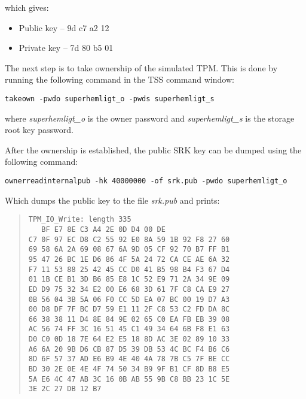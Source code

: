 \documentclass[10pt]{article}
\newcommand{\command}[1]{\texttt{#1}}
\begin{document}
      which gives:

      \begin{itemize}
        \item{Public key -- 9d c7 a2 12}
        \item{Private key -- 7d 80 b5 01}
      \end{itemize}

      The next step is to take ownership of the simulated TPM. This is done by
      running the following command in the TSS command window:

      \command{takeown -pwdo superhemligt\_o -pwds superhemligt\_s}

      where \textit{superhemligt\_o} is the owner password and
      \textit{superhemligt\_s} is the storage root key password.

      After the ownership is established, the public SRK key can be dumped using
      the following command:

      \command{ownerreadinternalpub -hk 40000000 -of srk.pub -pwdo
      superhemligt\_o}

      Which dumps the public key to the file \textit{srk.pub} and prints:

      \begin{quote}
        \texttt{TPM\_IO\_Write: length 335\\
        \ \ \  BF E7 8E C3 A4 2E 0D D4 00 DE \\
     C7 0F 97 EC D8 C2 55 92 E0 8A 59 1B 92 F8 27 60 \\
     69 58 6A 2A 69 08 67 6A 9D 05 CF 92 70 B7 FF B1 \\ 
     95 47 26 BC 1E D6 86 4F 5A 24 72 CA CE AE 6A 32 \\ 
     F7 11 53 88 25 42 45 CC D0 41 B5 98 B4 F3 67 D4  \\
     01 1B CE B1 3D B6 85 E8 1C 52 E9 71 2A 34 9E 09  \\
     ED D9 75 32 34 E2 00 E6 68 3D 61 7F C8 CA E9 27  \\
     0B 56 04 3B 5A 06 F0 CC 5D EA 07 BC 00 19 D7 A3 \\ 
     00 D8 DF 7F BC D7 59 E1 11 2F C8 53 C2 FD DA 8C \\ 
     66 38 38 11 D4 8E 84 9E 02 65 C0 EA FB EB 39 08  \\
     AC 56 74 FF 3C 16 51 45 C1 49 34 64 6B F8 E1 63  \\
     D0 C0 0D 18 7E 64 E2 E5 18 8D AC 3E 02 89 10 33  \\
     A6 6A 20 9B D6 CB 87 D5 39 DB 53 4C BC F4 B6 C6 \\ 
     8D 6F 57 37 AD E6 B9 4E 40 4A 78 7B C5 7F BE CC \\ 
     BD 30 2E 0E 4E 4F 74 50 34 B9 9F B1 CF 8D B8 E5  \\
     5A E6 4C 47 AB 3C 16 0B AB 55 9B C8 BB 23 1C 5E \\ 
     3E 2C 27 DB 12 B7
       }
      \end{quote}
\end{document}
